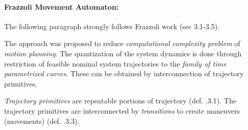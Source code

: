 \setcounter{chapter}{8}
\setcounter{section}{3}
\setcounter{subsection}{0}
\paragraph{Frazzoli Movement Automaton:} The following paragraph strongly follows Frazzoli work \cite{frazzoli2001robust} (sec 3.1-3.5).


The approach was proposed to reduce \emph{computational complexity problem} of \emph{motion planning}. The quantization of the system dynamics is done through restriction of feasible nominal system trajectories to the \emph{family of time parametrized curves}. These can be obtained by interconnection of trajectory primitives.

\emph{Trajectory primitives} are repeatable portions of trajectory (def. \cite{frazzoli2001robust}.3.1). The trajectory primitives are interconnected by \emph{transitions} to create maneuvers (movements) (def. \cite{frazzoli2001robust}.3.3). 

